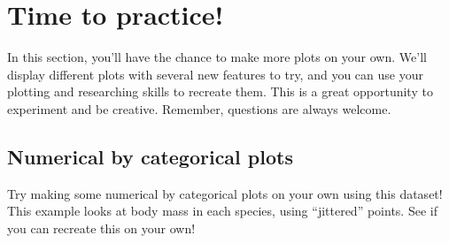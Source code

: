 \documentclass[
  letterpaper,
  DIV=11,
  numbers=noendperiod]{scrreprt}
\newenvironment{Shaded}{\begin{snugshade}}{\end{snugshade}}
\newcommand{\AttributeTok}[1]{\textcolor[rgb]{0.40,0.45,0.13}{#1}}
\newcommand{\CommentTok}[1]{\textcolor[rgb]{0.37,0.37,0.37}{#1}}
\newcommand{\DecValTok}[1]{\textcolor[rgb]{0.68,0.00,0.00}{#1}}
\newcommand{\FunctionTok}[1]{\textcolor[rgb]{0.28,0.35,0.67}{#1}}
\newcommand{\NormalTok}[1]{\textcolor[rgb]{0.00,0.23,0.31}{#1}}
\newcommand{\SpecialCharTok}[1]{\textcolor[rgb]{0.37,0.37,0.37}{#1}}
\newcommand{\StringTok}[1]{\textcolor[rgb]{0.13,0.47,0.30}{#1}}
\begin{document}
\begin{tcolorbox}
\begin{Shaded}
\end{Shaded}

\end{tcolorbox}

\section{Time to practice!}\label{time-to-practice}

In this section, you'll have the chance to make more plots on your own.
We'll display different plots with several new features to try, and you
can use your plotting and researching skills to recreate them. This is a
great opportunity to experiment and be creative. Remember, questions are
always welcome.

\subsection{Numerical by categorical
plots}\label{numerical-by-categorical-plots}

Try making some numerical by categorical plots on your own using this
dataset! This example looks at body mass in each species, using
``jittered'' points. See if you can recreate this on your own!
\end{document}
